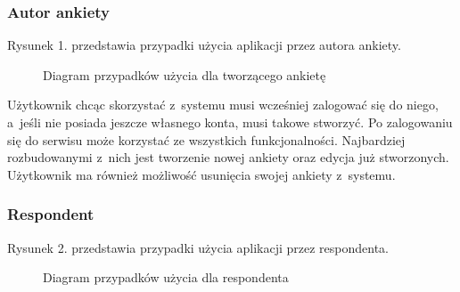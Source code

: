 \documentclass[8pt,a4paper,notitlepage]{article}
\begin{document}
\subsubsection{Autor ankiety}
Rysunek 1. przedstawia przypadki użycia aplikacji przez autora ankiety.
\begin{figure}[H]
\begin{center}
\caption{Diagram przypadków użycia dla tworzącego ankietę}
\end{center}
\end{figure}
Użytkownik chcąc skorzystać z~systemu musi wcześniej zalogować się do niego, a~jeśli nie posiada jeszcze własnego konta, musi takowe stworzyć. Po zalogowaniu się do serwisu może korzystać ze wszystkich funkcjonalności. Najbardziej rozbudowanymi z~nich jest tworzenie nowej ankiety oraz edycja już stworzonych. Użytkownik ma również możliwość usunięcia swojej ankiety z~systemu. 
\newpage
\subsubsection{Respondent}
Rysunek 2. przedstawia przypadki użycia aplikacji przez respondenta.
\begin{figure}[H]
\begin{center}
\caption{Diagram przypadków użycia dla respondenta}
\end{center}
\end{figure}
\end{document}
